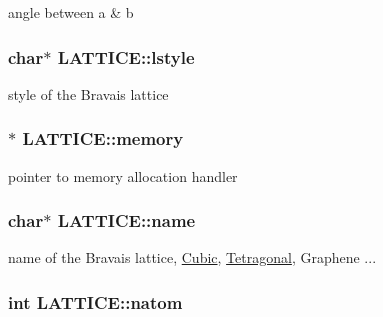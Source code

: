angle between {\ttfamily a \& b} 

\hypertarget{class_l_a_t_t_i_c_e_a07635742a674cf3203f8e2c5c48118f8}{}
\subsubsection[{lstyle}]{\setlength{\rightskip}{0pt plus 5cm}char$\ast$ L\+A\+T\+T\+I\+C\+E\+::lstyle}\label{class_l_a_t_t_i_c_e_a07635742a674cf3203f8e2c5c48118f8}


style of the Bravais lattice 

\hypertarget{class_l_a_t_t_i_c_e_a4e8795a8cbd0a4594657a071fe68b9c3}{}
\subsubsection[{memory}]{$\ast$ L\+A\+T\+T\+I\+C\+E\+::memory}\label{class_l_a_t_t_i_c_e_a4e8795a8cbd0a4594657a071fe68b9c3}


pointer to memory allocation handler 

\hypertarget{class_l_a_t_t_i_c_e_ad986fd67c523ad7201ba9deaefcf6543}{}
\subsubsection[{name}]{\setlength{\rightskip}{0pt plus 5cm}char$\ast$ L\+A\+T\+T\+I\+C\+E\+::name}\label{class_l_a_t_t_i_c_e_ad986fd67c523ad7201ba9deaefcf6543}


name of the Bravais lattice, \hyperlink{class_cubic}{Cubic}, \hyperlink{class_tetragonal}{Tetragonal}, Graphene ... 

\hypertarget{class_l_a_t_t_i_c_e_a9efda355b82d0fcbc013b1fdf17bb758}{}
\subsubsection[{natom}]{\setlength{\rightskip}{0pt plus 5cm}int L\+A\+T\+T\+I\+C\+E\+::natom}\label{class_l_a_t_t_i_c_e_a9efda355b82d0fcbc013b1fdf17bb758}


